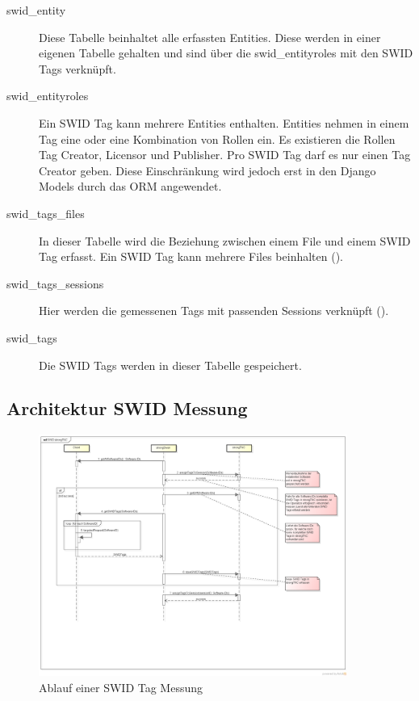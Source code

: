 \begin{description}
	
	\item[swid\_entity] Diese Tabelle beinhaltet alle erfassten Entities. Diese werden in einer eigenen Tabelle gehalten und sind über die swid\_entityroles
	mit den SWID Tags verknüpft.

	\item [swid\_entityroles] Ein SWID Tag kann mehrere Entities enthalten.
	Entities nehmen in einem Tag eine oder eine Kombination von Rollen ein. Es
	existieren die Rollen Tag Creator, Licensor und Publisher. Pro SWID Tag darf es
	nur einen Tag Creator geben. Diese Einschränkung wird jedoch erst in den Django
	Models durch das ORM angewendet.

	\item [swid\_tags\_files] In dieser Tabelle wird die Beziehung zwischen einem
	File und einem SWID Tag erfasst. Ein SWID Tag kann mehrere Files beinhalten
	().

	\item[swid\_tags\_sessions] Hier werden die gemessenen Tags mit passenden
	Sessions verknüpft ().
	
	\item[swid\_tags] Die SWID Tags werden in dieser Tabelle gespeichert.

\end{description}


\subsection{Architektur SWID Messung}

\begin{figure}[H]
	\centering
	\includegraphics[width=0.9\textwidth]{./images/architecture/SWID_strongTNC.png}
	\caption{Ablauf einer SWID Tag Messung}
	\label{fig:swid-measurement}
\end{figure}

